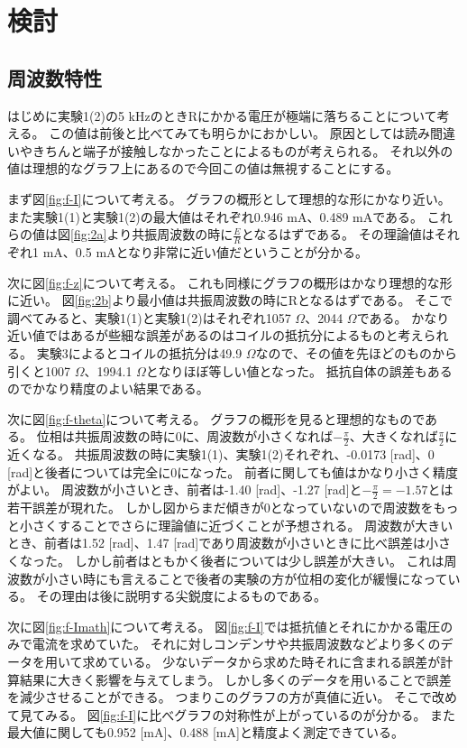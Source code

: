 \documentclass[11pt,a4paper,fleqn]{jsarticle}
\begin{document}
\section{検討}
\subsection{周波数特性}
はじめに実験1(2)の5 kHzのときRにかかる電圧が極端に落ちることについて考える。
この値は前後と比べてみても明らかにおかしい。
原因としては読み間違いやきちんと端子が接触しなかったことによるものが考えられる。
それ以外の値は理想的なグラフ上にあるので今回この値は無視することにする。

まず図\ref{fig:f-I}について考える。
グラフの概形として理想的な形にかなり近い。
また実験1(1)と実験1(2)の最大値はそれぞれ0.946 mA、0.489 mAである。
これらの値は図\ref{fig:2a}より共振周波数の時に$\frac{E}{R}$となるはずである。
その理論値はそれぞれ1 mA、0.5 mAとなり非常に近い値だということが分かる。

次に図\ref{fig:f-z}について考える。
これも同様にグラフの概形はかなり理想的な形に近い。
図\ref{fig:2b}より最小値は共振周波数の時にRとなるはずである。
そこで調べてみると、実験1(1)と実験1(2)はそれぞれ1057 $\Omega$、2044 $\Omega$である。
かなり近い値ではあるが些細な誤差があるのはコイルの抵抗分によるものと考えられる。
実験3によるとコイルの抵抗分は49.9 $\Omega$なので、その値を先ほどのものから引くと1007 $\Omega$、1994.1 $\Omega$となりほぼ等しい値となった。
抵抗自体の誤差もあるのでかなり精度のよい結果である。

次に図\ref{fig:f-theta}について考える。
グラフの概形を見ると理想的なものである。
位相は共振周波数の時に0に、周波数が小さくなれば$-\frac{\pi}{2}$、大きくなれば$\frac{\pi}{2}$に近くなる。
共振周波数の時に実験1(1)、実験1(2)それぞれ、-0.0173 [rad]、0 [rad]と後者については完全に0になった。
前者に関しても値はかなり小さく精度がよい。
周波数が小さいとき、前者は-1.40 [rad]、-1.27 [rad]と$-\frac{\pi}{2}=-1.57$とは若干誤差が現れた。
しかし図からまだ傾きが0となっていないので周波数をもっと小さくすることでさらに理論値に近づくことが予想される。
周波数が大きいとき、前者は1.52 [rad]、1.47 [rad]であり周波数が小さいときに比べ誤差は小さくなった。
しかし前者はともかく後者については少し誤差が大きい。
これは周波数が小さい時にも言えることで後者の実験の方が位相の変化が緩慢になっている。
その理由は後に説明する尖鋭度によるものである。

次に図\ref{fig:f-Imath}について考える。
図\ref{fig:f-I}では抵抗値とそれにかかる電圧のみで電流を求めていた。
それに対しコンデンサや共振周波数などより多くのデータを用いて求めている。
少ないデータから求めた時それに含まれる誤差が計算結果に大きく影響を与えてしまう。
しかし多くのデータを用いることで誤差を減少させることができる。
つまりこのグラフの方が真値に近い。
そこで改めて見てみる。
図\ref{fig:f-I}に比べグラフの対称性が上がっているのが分かる。
また最大値に関しても0.952 [mA]、0.488 [mA]と精度よく測定できている。
\end{document}
